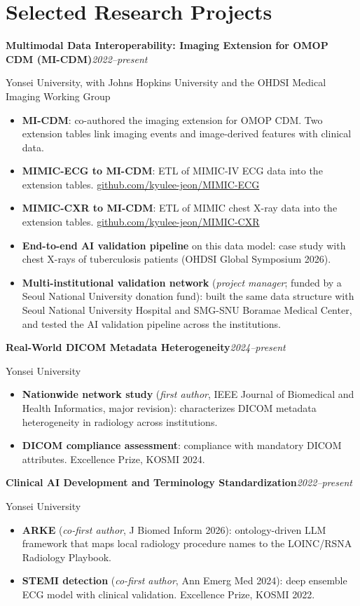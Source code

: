 \documentclass[9pt,letterpaper]{extarticle}
\newcommand{\head}[2]{\textbf{#1}\hfill\textit{#2}\par}
\newcommand{\subhead}[2]{#1\hfill #2\par}
\begin{document}
\section{Selected Research Projects}
\head{Multimodal Data Interoperability: Imaging Extension for OMOP CDM (MI-CDM)}{2022--present}
\subhead{Yonsei University, with Johns Hopkins University and the OHDSI Medical Imaging Working Group}{}
\begin{itemize}
\item \textbf{MI-CDM}: co-authored the imaging extension for OMOP CDM. Two extension tables link imaging events and image-derived features with clinical data.
\item \textbf{MIMIC-ECG to MI-CDM}: ETL of MIMIC-IV ECG data into the extension tables. \href{https://github.com/kyulee-jeon/MIMIC-ECG}{github.com/kyulee-jeon/MIMIC-ECG}
\item \textbf{MIMIC-CXR to MI-CDM}: ETL of MIMIC chest X-ray data into the extension tables. \href{https://github.com/kyulee-jeon/MIMIC-CXR}{github.com/kyulee-jeon/MIMIC-CXR}
\item \textbf{End-to-end AI validation pipeline} on this data model: case study with chest X-rays of tuberculosis patients (OHDSI Global Symposium 2026).
\item \textbf{Multi-institutional validation network} (\textit{project manager}; funded by a Seoul National University donation fund): built the same data structure with Seoul National University Hospital and SMG-SNU Boramae Medical Center, and tested the AI validation pipeline across the institutions.
\end{itemize}
\pagebreak
\head{Real-World DICOM Metadata Heterogeneity}{2024--present}
\subhead{Yonsei University}{}
\begin{itemize}
\item \textbf{Nationwide network study} (\textit{first author}, IEEE Journal of Biomedical and Health Informatics, major revision): characterizes DICOM metadata heterogeneity in radiology across institutions.
\item \textbf{DICOM compliance assessment}: compliance with mandatory DICOM attributes. Excellence Prize, KOSMI 2024.
\end{itemize}
\vspace{2pt}
\head{Clinical AI Development and Terminology Standardization}{2022--present}
\subhead{Yonsei University}{}
\begin{itemize}
\item \textbf{ARKE} (\textit{co-first author}, J Biomed Inform 2026): ontology-driven LLM framework that maps local radiology procedure names to the LOINC/RSNA Radiology Playbook.
\item \textbf{STEMI detection} (\textit{co-first author}, Ann Emerg Med 2024): deep ensemble ECG model with clinical validation. Excellence Prize, KOSMI 2022.
\end{itemize}
\end{document}
